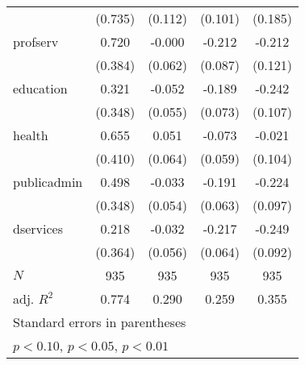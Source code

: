 {\begin{tabular}{l*{4}{c}}
            &     (0.735)         &     (0.112)         &     (0.101)         &     (0.185)         \\
[1em]
profserv    &       0.720\sym{*}  &      -0.000         &      -0.212\sym{**} &      -0.212\sym{*}  \\
            &     (0.384)         &     (0.062)         &     (0.087)         &     (0.121)         \\
[1em]
education   &       0.321         &      -0.052         &      -0.189\sym{**} &      -0.242\sym{**} \\
            &     (0.348)         &     (0.055)         &     (0.073)         &     (0.107)         \\
[1em]
health      &       0.655         &       0.051         &      -0.073         &      -0.021         \\
            &     (0.410)         &     (0.064)         &     (0.059)         &     (0.104)         \\
[1em]
publicadmin &       0.498         &      -0.033         &      -0.191\sym{***}&      -0.224\sym{**} \\
            &     (0.348)         &     (0.054)         &     (0.063)         &     (0.097)         \\
[1em]
dservices   &       0.218         &      -0.032         &      -0.217\sym{***}&      -0.249\sym{**} \\
            &     (0.364)         &     (0.056)         &     (0.064)         &     (0.092)         \\
\hline
\(N\)       &         935         &         935         &         935         &         935         \\
adj. \(R^{2}\)&       0.774         &       0.290         &       0.259         &       0.355         \\
\hline\hline
\multicolumn{5}{l}{\footnotesize Standard errors in parentheses}\\
\multicolumn{5}{l}{\footnotesize \sym{*} \(p<0.10\), \sym{**} \(p<0.05\), \sym{***} \(p<0.01\)}\\
\end{tabular}
}
